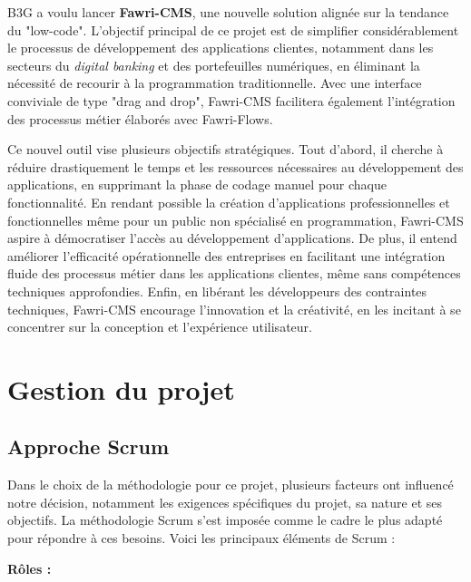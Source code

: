 \hspace{\parindent}B3G a voulu lancer \textbf{Fawri-CMS}, une nouvelle solution alignée sur la tendance du "low-code". L'objectif principal de ce projet est de simplifier considérablement le processus de développement des applications clientes, notamment dans les secteurs du \textit{digital banking} et des portefeuilles numériques, en éliminant la nécessité de recourir à la programmation traditionnelle. Avec une interface conviviale de type "drag and drop", Fawri-CMS facilitera également l'intégration des processus métier élaborés avec Fawri-Flows.

Ce nouvel outil vise plusieurs objectifs stratégiques. Tout d'abord, il cherche à réduire drastiquement le temps et les ressources nécessaires au développement des applications, en supprimant la phase de codage manuel pour chaque fonctionnalité. En rendant possible la création d'applications professionnelles et fonctionnelles même pour un public non spécialisé en programmation, Fawri-CMS aspire à démocratiser l'accès au développement d'applications. De plus, il entend améliorer l'efficacité opérationnelle des entreprises en facilitant une intégration fluide des processus métier dans les applications clientes, même sans compétences techniques approfondies. Enfin, en libérant les développeurs des contraintes techniques, Fawri-CMS encourage l'innovation et la créativité, en les incitant à se concentrer sur la conception et l'expérience utilisateur.




\section{Gestion du projet}

\subsection{Approche Scrum}

\hspace{\parindent}Dans le choix de la méthodologie pour ce projet, plusieurs facteurs ont influencé notre décision, notamment les exigences spécifiques du projet, sa nature et ses objectifs. La méthodologie Scrum s'est imposée comme le cadre le plus adapté pour répondre à ces besoins. Voici les principaux éléments de Scrum :

\textbf{Rôles :}


